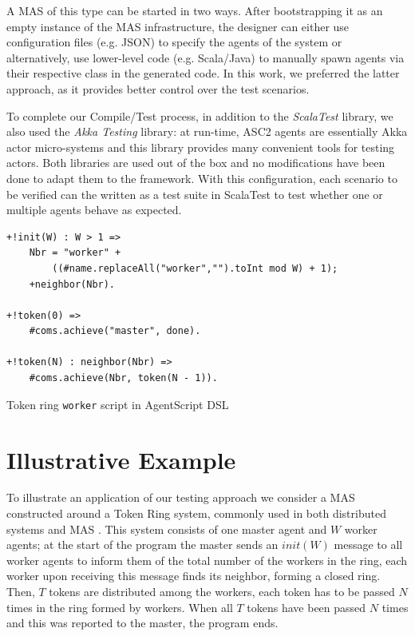 A MAS of this type can be started in two ways. After bootstrapping it as an empty instance of the MAS infrastructure, the designer can either use configuration files (e.g. JSON) to specify the agents of the system or alternatively, use lower-level code (e.g. Scala/Java) to manually spawn agents via their respective class in the generated code. In this work, we preferred the latter approach, as it provides better control over the test scenarios.

To complete our Compile/Test process, in addition to the \textit{ScalaTest} library, we also used the \textit{Akka Testing} library: at run-time, ASC2 agents are essentially Akka actor micro-systems and this library provides many convenient tools for testing actors. Both libraries are used out of the box and no modifications have been done to adapt them to the framework. With this configuration, each scenario to be verified can the written as a test suite in ScalaTest to test whether one or multiple agents behave as expected.

\begin{listing}[!tb]

\centering
\begin{verbatim}
+!init(W) : W > 1 =>
    Nbr = "worker" + 
        ((#name.replaceAll("worker","").toInt mod W) + 1);
    +neighbor(Nbr).

+!token(0) =>
    #coms.achieve("master", done).

+!token(N) : neighbor(Nbr) =>
    #coms.achieve(Nbr, token(N - 1)).
\end{verbatim}
\vspace{-5pt}
    \caption{Token ring \texttt{worker} script in AgentScript DSL}
    \label{lst:script_1}
\vspace{-5pt}
\end{listing}

\section{Illustrative Example}
\label{sec:example}
To illustrate an application of our testing approach we consider a MAS constructed around a Token Ring system, commonly used in both distributed systems and MAS \cite{MohajeriParizi2020,Cardoso2013}. This system consists of one master agent and $W$ worker agents; at the start of the program the master sends an $init(W)$ message to all worker agents to inform them of the total number of the workers in the ring, each worker upon receiving this message finds its neighbor, forming a closed ring. Then, $T$ tokens are distributed among the workers, each token has to be passed $N$ times in the ring formed by workers. When all $T$ tokens have been passed $N$ times and this was reported to the master, the program ends.

